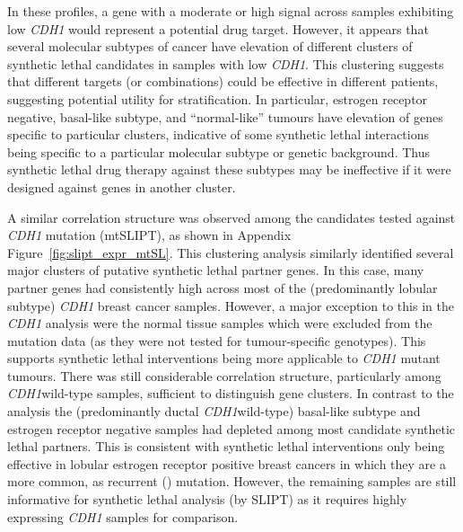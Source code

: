 In these  profiles, a gene with a moderate or high signal across samples exhibiting low \textit{CDH1}  would represent a potential drug target. However, it appears that several molecular subtypes of cancer have elevation of different clusters of \gls{synthetic lethal} candidates in samples with low \textit{CDH1}. This clustering suggests that different targets (or combinations) could be effective in different patients, suggesting potential utility for stratification.  In particular, estrogen receptor negative, basal-like subtype, and ``normal-like'' tumours \citep{Eroles2012, Parker2009, Dai2015} have elevation of genes specific to particular clusters, indicative of some \gls{synthetic lethal} interactions being specific to a particular molecular subtype or genetic background. Thus \gls{synthetic lethal} drug therapy against these subtypes may be ineffective if it were designed against genes in another cluster.
 
A similar correlation structure was observed among the candidates tested against \textit{CDH1} \gls{mutation} (\acrshort{mtSLIPT}), as shown in Appendix Figure~\ref{fig:slipt_expr_mtSL}. This clustering analysis similarly identified several major clusters of putative \gls{synthetic lethal} partner genes. In this case, many partner genes had consistently high  across most of the (predominantly lobular subtype) \textit{CDH1} breast cancer samples. However, a major exception to this in the \textit{CDH1}  analysis were the normal tissue samples which were excluded from the \gls{mutation} data (as they were not tested for tumour-specific genotypes). This supports \gls{synthetic lethal} interventions being more applicable to \textit{CDH1} \gls{mutant} tumours. There was still considerable correlation structure, particularly among \textit{CDH1}\gls{wild-type} samples, sufficient to distinguish gene clusters. In contrast to the  analysis the (predominantly ductal \textit{CDH1}\gls{wild-type}) basal-like subtype and estrogen receptor negative samples had depleted  among most candidate \gls{synthetic lethal} partners. This is consistent with \gls{synthetic lethal} interventions only being effective in lobular estrogen receptor positive breast cancers in which they are a more common, as recurrent () \gls{mutation}. However, the remaining samples are still informative for \gls{synthetic lethal} analysis (by \gls{SLIPT}) as it requires highly expressing \textit{CDH1} samples for comparison.

